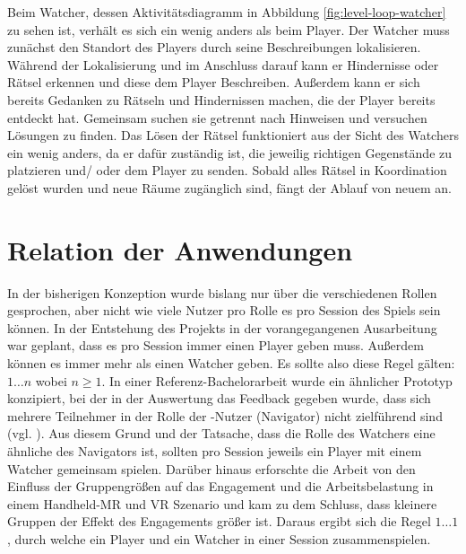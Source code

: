 Beim Watcher, dessen Aktivitätsdiagramm in Abbildung \ref{fig:level-loop-watcher} zu sehen ist, verhält es sich ein wenig anders als beim Player. Der Watcher muss zunächst den Standort des Players durch seine Beschreibungen lokalisieren. Während der Lokalisierung und im Anschluss darauf kann er Hindernisse oder Rätsel erkennen und diese dem Player Beschreiben. Außerdem kann er sich bereits Gedanken zu Rätseln und Hindernissen machen, die der Player bereits entdeckt hat. Gemeinsam suchen sie getrennt nach Hinweisen und versuchen Lösungen zu finden. Das Lösen der Rätsel funktioniert aus der Sicht des Watchers ein wenig anders, da er dafür zuständig ist, die jeweilig richtigen Gegenstände zu platzieren und/ oder dem Player zu senden. Sobald alles Rätsel in Koordination gelöst wurden und neue Räume zugänglich sind, fängt der Ablauf von neuem an.

\section{Relation der Anwendungen}
In der bisherigen Konzeption wurde bislang nur über die verschiedenen Rollen gesprochen, aber nicht wie viele Nutzer pro Rolle es pro Session des Spiels sein können. In der Entstehung des Projekts in der vorangegangenen Ausarbeitung war geplant, dass es pro Session immer einen Player geben muss. Außerdem können es immer mehr als einen Watcher geben. Es sollte also diese Regel gälten: $1\ldots n$ \quad wobei $n \geq 1$. In einer Referenz-Bachelorarbeit wurde ein ähnlicher Prototyp konzipiert, bei der in der Auswertung das Feedback gegeben wurde, dass sich mehrere Teilnehmer in der Rolle der -Nutzer (Navigator) nicht zielführend sind (vgl. \cite[S. 34]{lotz_konzeption_2021}). Aus diesem Grund und der Tatsache, dass die Rolle des Watchers eine ähnliche des Navigators ist, sollten pro Session jeweils ein Player mit einem Watcher gemeinsam spielen. Darüber hinaus erforschte die Arbeit von \cite[S. 197:22]{bautista_isaza_understanding_2024} den Einfluss der Gruppengrößen auf das Engagement und die Arbeitsbelastung in einem Handheld-\ac{MR} und \ac{VR} Szenario und kam zu dem Schluss, dass kleinere Gruppen der Effekt des Engagements größer ist. Daraus ergibt sich die Regel $1\ldots1$, durch welche ein Player und ein Watcher in einer Session zusammenspielen.

